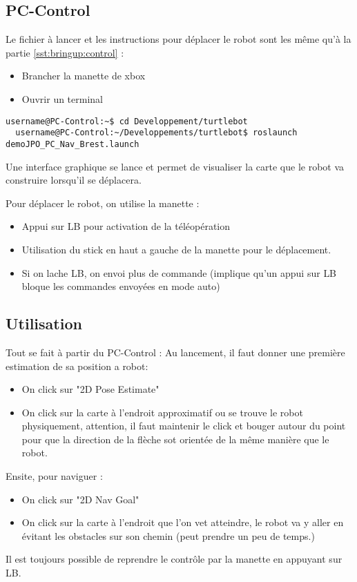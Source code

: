 \documentclass[11pt, a4paper,notitlepage]{article}
\begin{document}
\subsection{PC-Control}
Le fichier à lancer et les instructions pour déplacer le robot sont les même qu'à la partie \ref{sst:bringup:control} :
\begin{itemize}
  \item Brancher la manette de xbox
  \item Ouvrir un terminal
\end{itemize}
\begin{lstlisting}[style=Bash]
  username@PC-Control:~$ cd Developpement/turtlebot
  username@PC-Control:~/Developpements/turtlebot$ roslaunch demoJPO_PC_Nav_Brest.launch
\end{lstlisting}
Une interface graphique se lance et permet de visualiser la carte que le robot va construire lorsqu'il se déplacera.

Pour déplacer le robot, on utilise la manette :
\begin{itemize}
  \item Appui sur \textsc{LB} pour activation de la téléopération
  \item Utilisation du stick en haut a gauche de la manette pour le déplacement.
  \item Si on lache \textsc{LB}, on envoi plus de commande (implique qu'un appui sur \textsc{LB} bloque les commandes envoyées en mode auto)
\end{itemize}

\subsection{Utilisation}

Tout se fait à partir du PC-Control :
Au lancement, il faut donner une première estimation de sa position a robot:
\begin{itemize}
  \item On click sur "2D Pose Estimate"
  \item On click sur la carte à l'endroit approximatif ou se trouve le robot physiquement, attention, il faut maintenir le click et bouger autour du point pour que la direction de la flèche sot orientée de la même manière que le robot.
\end{itemize}
Ensite, pour naviguer :
\begin{itemize}
  \item On click sur "2D Nav Goal"
  \item On click sur la carte à l'endroit que l'on vet atteindre, le robot va y aller en évitant les obstacles sur son chemin (peut prendre un peu de temps.)
\end{itemize}
Il est toujours possible de reprendre le contrôle par la manette en appuyant sur \textsc{LB}.
\end{document}
